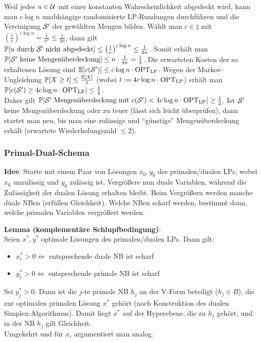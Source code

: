 Weil jedes $u \in \U$ mit einer konstanten Wahrscheinlichkeit abgedeckt wird,
kann man $c \log n$ unabhängige randomisierte
LP-Rundungen durchführen und die Vereinigung $\S'$ der gewählten Mengen bilden.
Wählt man $c \in \natural$ mit
$\left(\frac{1}{e}\right)^{c \log n} = \frac{1}{n^c} \le \frac{1}{4n}$, dann gilt\\
$\PP[\text{$u$ durch $\S'$ nicht abgedeckt}] \le
\left(\frac{1}{e}\right)^{c \log n} \le \frac{1}{4n}$.
Somit erhält man\\
$\PP[\text{$\S'$ keine Mengenüberdeckung}] \le
n \cdot \frac{1}{4n} = \frac{1}{4}$.
Die erwarteten Kosten der so erhaltenen Lösung sind
$\EE[c(\S')] \le c \log n \cdot \OPTLP$.
Wegen der Markov-Ungleichung $\PP[X \ge t] \le \frac{\EE[X]}{t}$
(wobei $t := 4c \log n \cdot \OPTLP$) erhält man
$\PP[c(\S') \ge 4c\log n \cdot \OPTLP] \le \frac{1}{4}$.\\
Daher gilt
$\PP[\text{$\S'$ Mengenüberdeckung mit $c(\S') < 4c \log n \cdot \OPTLP$}] \ge \frac{1}{2}$.
Ist $\S'$ keine Mengenüberdeckung oder zu teuer (lässt sich leicht überprüfen),
dann startet man neu, bis man eine zulässige und "`günstige"' Mengenüberdeckung erhält
(erwartete Wiederholungszahl $\le 2$).

\pagebreak

\subsubsection{%
    Primal-Dual-Schema%
}

\textbf{Idee}:
Starte mit einem Paar von Lösungen $x_0, y_0$ des primalen/dualen LPs,
wobei $x_0$ unzulässig und $y_0$ zulässig ist.
Vergrößere nun duale Variablen, während die Zulässigkeit der dualen Lösung erhalten bleibt.
Beim Vergrößern werden manche duale NBen  (erfüllen Gleichheit).
Welche NBen scharf werden, bestimmt dann, welche primalen Variablen vergrößert werden.

\textbf{Lemma (komplementäre Schlupfbedingung)}:\\
Seien $x^\ast, y^\ast$ optimale Lösungen des primalen/dualen LPs.
Dann gilt:
\begin{itemize}
    \item
    $x_i^\ast > 0 \iff$ entsprechende duale NB ist scharf
    
    \item
    $y_j^\ast > 0 \iff$ entsprechende primale NB ist scharf
\end{itemize}

\begin{Beweis}
    Sei $y_j^\ast > 0$.
    Dann ist die $j$-te primale NB $h_j$ an der V-Form beteiligt ($h_j \in B$),
    die zur optimalen primalen Lösung $x^\ast$ gehört
    (nach Konstruktion des dualen Simplex-Algorithmus).
    Damit liegt $x^\ast$ auf der Hyperebene, die zu $h_j$ gehört, und
    in der NB $h_j$ gilt Gleichheit.\\
    Umgekehrt und für $x_i$ argumentiert man analog.
\end{Beweis}

